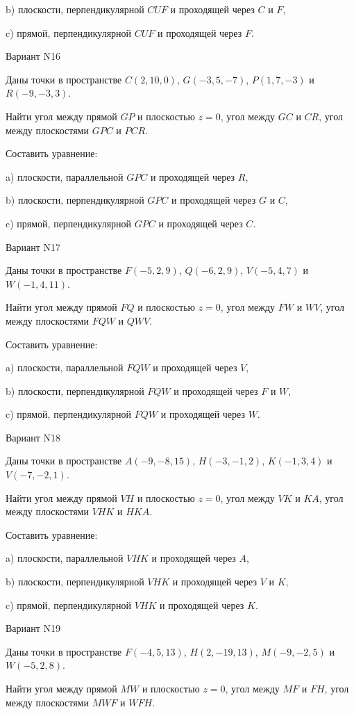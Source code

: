 \documentclass[11pt]{report}
\begin{document}
b) плоскости, перпендикулярной $CUF$ и проходящей через $C$ и $F$,

c) прямой, перпендикулярной $CUF$ и проходящей через $F$.

Вариант N16

Даны точки в пространстве
$C(2, 10, 0)$, $G(-3, 5, -7)$, $P(1, 7, -3)$ и
$R(-9, -3, 3)$.

Найти угол между прямой $GP$ и плоскостью $z = 0$, угол между $GC$ и $CR$, угол между плоскостями $GPC$ 
и $PCR$.

Составить уравнение: 

a) плоскости, параллельной $GPC$ и проходящей через $R$,

b) плоскости, перпендикулярной $GPC$ и проходящей через $G$ и $C$,

c) прямой, перпендикулярной $GPC$ и проходящей через $C$.

Вариант N17

Даны точки в пространстве
$F(-5, 2, 9)$, $Q(-6, 2, 9)$, $V(-5, 4, 7)$ и
$W(-1, 4, 11)$.

Найти угол между прямой $FQ$ и плоскостью $z = 0$, угол между $FW$ и $WV$, угол между плоскостями $FQW$ 
и $QWV$.

Составить уравнение: 

a) плоскости, параллельной $FQW$ и проходящей через $V$,

b) плоскости, перпендикулярной $FQW$ и проходящей через $F$ и $W$,

c) прямой, перпендикулярной $FQW$ и проходящей через $W$.

Вариант N18

Даны точки в пространстве
$A(-9, -8, 15)$, $H(-3, -1, 2)$, $K(-1, 3, 4)$ и
$V(-7, -2, 1)$.

Найти угол между прямой $VH$ и плоскостью $z = 0$, угол между $VK$ и $KA$, угол между плоскостями $VHK$ 
и $HKA$.

Составить уравнение: 

a) плоскости, параллельной $VHK$ и проходящей через $A$,

b) плоскости, перпендикулярной $VHK$ и проходящей через $V$ и $K$,

c) прямой, перпендикулярной $VHK$ и проходящей через $K$.

Вариант N19

Даны точки в пространстве
$F(-4, 5, 13)$, $H(2, -19, 13)$, $M(-9, -2, 5)$ и
$W(-5, 2, 8)$.

Найти угол между прямой $MW$ и плоскостью $z = 0$, угол между $MF$ и $FH$, угол между плоскостями $MWF$ 
и $WFH$.
\end{document}
